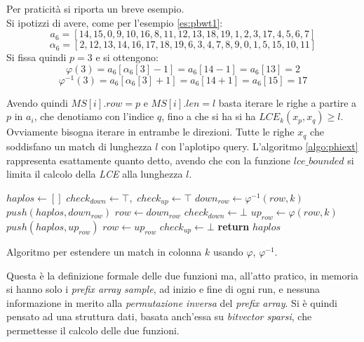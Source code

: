 \begin{esempio}
  Per praticità si riporta un breve esempio.\\
  Si ipotizzi di avere, come per l'esempio \ref{es:pbwt1}:
  \[a_6=[14,15,0,9,10,16,8,11,12,13,18,19,1,2,3,17,4,5,6,7]\]
  \[\alpha_6=[2,12,13,14,16,17,18,19,6,3,4,7,8,9,0,1,5,15,10,11]\]
  Si fissa quindi $p=3$ e si ottengono:
  \[\varphi(3)=a_6[\alpha_6[3]-1]=a_6[14-1]=a_6[13]=2\]
  \[\varphi^{-1}(3)=a_6[\alpha_6[3]+1]=a_6[14+1]=a_6[15]=17\]
\end{esempio}
Avendo quindi $MS[i].row=p$ e $MS[i].len=l$ basta iterare le righe a partire a
$p$ in $a_i$, che denotiamo con l'indice $q$, fino a che si ha si ha 
$LCE_k(x_p, x_q)\geq l$. Ovviamente bisogna iterare in entrambe le
direzioni. Tutte le righe $x_q$ che soddisfano un match di lunghezza $l$ con
l'aplotipo query. L'algoritmo \ref{algo:phiext} rappresenta esattamente quanto
detto, avendo che con la funzione $lce\_bounded$ si limita il calcolo della
\textit{LCE} alla lunghezza $l$.\\
\begin{algorithm}
  \begin{algorithmic}[1]
    \State $haplos\gets []$
    \State $check_{down}\gets \top,\,\,check_{up}\gets \top$
    \State $down_{row}\gets \varphi^{-1}(row, k)$
    \State $push(haplos, down_{row})$
    \State $row \gets down_{row}$
    \Else
    \State $check_{down}\gets \bot$
    \EndIf
    \EndWhile
    \State $up_{row}\gets \varphi(row, k)$
    \State $push(haplos, up_{row})$
    \State $row \gets up_{row}$
    \Else
    \State $check_{up}\gets \bot$
    \EndIf
    \EndWhile
    \State \textbf{return} $haplos$
    \EndFunction
  \end{algorithmic}
  \caption{Algoritmo per estendere un match in colonna $k$ usando $\varphi$,
  $\varphi^{-1}$.}
  \label{algo:phiext}
\end{algorithm}
Questa è la definizione formale delle due funzioni ma, all'atto pratico, in
memoria si hanno solo i \textit{prefix array sample}, ad inizio e fine di ogni
run, e nessuna informazione in merito alla \textit{permutazione inversa} del
\textit{prefix array}. Si è quindi pensato ad una struttura dati, basata
anch'essa su \textit{bitvector sparsi}, che permettesse il calcolo delle due
funzioni. 
